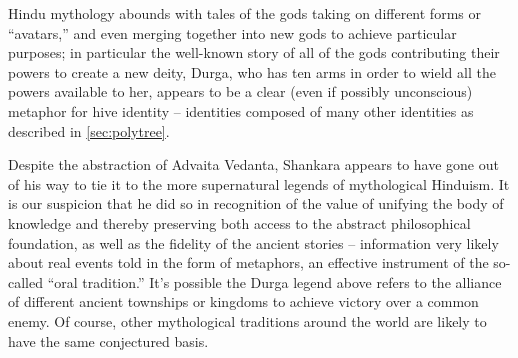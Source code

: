 \documentclass[pra,twocolumn,groupedaddress,10pt]{revtex4}
\theoremstyle{definition}
\begin{document}
Hindu mythology abounds with tales of the gods taking on different forms or ``avatars,'' and even merging together into new gods to achieve particular purposes; in particular the well-known story of all of the gods contributing their powers to create a new deity, Durga, who has ten arms in order to wield all the powers available to her, appears to be a clear (even if possibly unconscious) metaphor for hive identity -- identities composed of many other identities as described in \autoref{sec:polytree}.

Despite the abstraction of Advaita Vedanta, Shankara appears to have gone out of his way to tie it to the more supernatural legends of mythological Hinduism. It is our suspicion that he did so in recognition of the value of unifying the body of knowledge and thereby preserving both access to the abstract philosophical foundation, as well as the fidelity of the ancient stories -- information very likely about real events told in the form of metaphors, an effective instrument of the so-called ``oral tradition.'' It's possible the Durga legend above refers to the alliance of different ancient townships or kingdoms to achieve victory over a common enemy. Of course, other mythological traditions around the world are likely to have the same conjectured basis.
\end{document}
